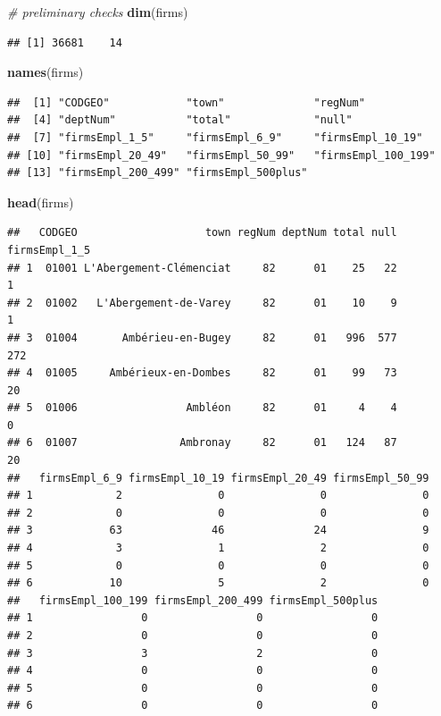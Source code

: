 \documentclass[]{article}
\newenvironment{Shaded}{\begin{snugshade}}{\end{snugshade}}
\newcommand{\KeywordTok}[1]{\textcolor[rgb]{0.13,0.29,0.53}{\textbf{#1}}}
\newcommand{\CommentTok}[1]{\textcolor[rgb]{0.56,0.35,0.01}{\textit{#1}}}
\newcommand{\NormalTok}[1]{#1}
\begin{document}
\begin{Shaded}
\begin{Highlighting}[]
\CommentTok{# preliminary checks}
\KeywordTok{dim}\NormalTok{(firms)}
\end{Highlighting}
\end{Shaded}

\begin{verbatim}
## [1] 36681    14
\end{verbatim}

\begin{Shaded}
\begin{Highlighting}[]
\KeywordTok{names}\NormalTok{(firms)}
\end{Highlighting}
\end{Shaded}

\begin{verbatim}
##  [1] "CODGEO"            "town"              "regNum"           
##  [4] "deptNum"           "total"             "null"             
##  [7] "firmsEmpl_1_5"     "firmsEmpl_6_9"     "firmsEmpl_10_19"  
## [10] "firmsEmpl_20_49"   "firmsEmpl_50_99"   "firmsEmpl_100_199"
## [13] "firmsEmpl_200_499" "firmsEmpl_500plus"
\end{verbatim}

\begin{Shaded}
\begin{Highlighting}[]
\KeywordTok{head}\NormalTok{(firms)}
\end{Highlighting}
\end{Shaded}

\begin{verbatim}
##   CODGEO                    town regNum deptNum total null firmsEmpl_1_5
## 1  01001 L'Abergement-Clémenciat     82      01    25   22             1
## 2  01002   L'Abergement-de-Varey     82      01    10    9             1
## 3  01004       Ambérieu-en-Bugey     82      01   996  577           272
## 4  01005     Ambérieux-en-Dombes     82      01    99   73            20
## 5  01006                 Ambléon     82      01     4    4             0
## 6  01007                Ambronay     82      01   124   87            20
##   firmsEmpl_6_9 firmsEmpl_10_19 firmsEmpl_20_49 firmsEmpl_50_99
## 1             2               0               0               0
## 2             0               0               0               0
## 3            63              46              24               9
## 4             3               1               2               0
## 5             0               0               0               0
## 6            10               5               2               0
##   firmsEmpl_100_199 firmsEmpl_200_499 firmsEmpl_500plus
## 1                 0                 0                 0
## 2                 0                 0                 0
## 3                 3                 2                 0
## 4                 0                 0                 0
## 5                 0                 0                 0
## 6                 0                 0                 0
\end{verbatim}
\end{document}
